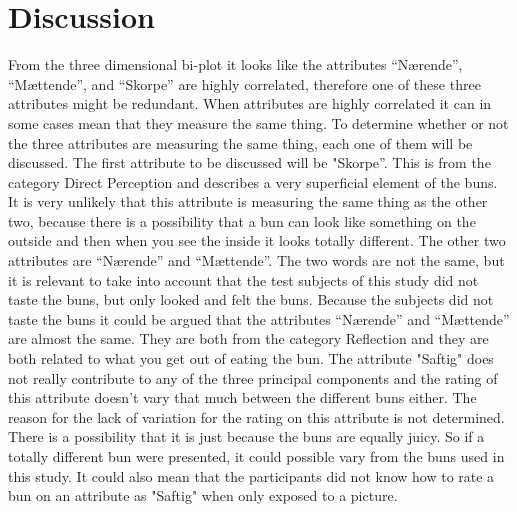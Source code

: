 \section*{Discussion}
\label{discussion}
%
From the three dimensional bi-plot it looks like the attributes “Nærende”, “Mættende”, and “Skorpe” are highly correlated, therefore one of these three attributes might be redundant. 
When attributes are highly correlated it can in some cases mean that they measure the same thing. To determine whether or not the three attributes are measuring the same thing, each one of them will be discussed. \blankline
%
The first attribute to be discussed will be "Skorpe''. This is from the category Direct Perception and describes a very superficial element of the buns. It is very unlikely that this attribute is measuring the same thing as the other two, because there is a possibility that a bun can look like something on the outside and then when you see the inside it looks totally different. \blankline
%
The other two attributes are “Nærende” and “Mættende”. The two words are not the same, but it is relevant to take into account that the test subjects of this study did not taste the buns, but only looked and felt the buns. Because the subjects did not taste the buns it could be argued that the attributes “Nærende” and “Mættende” are almost the same. They are both from the category Reflection and they are both related to what you get out of eating the bun. \blankline
%
The attribute "Saftig" does not really contribute to any of the three principal components and the rating of this attribute doesn't vary that much between the different buns either. The reason for the lack of variation for the rating on this attribute is not determined. There is a possibility that it is just because the buns are equally juicy. So if a totally different bun were presented, it could possible vary from the buns used in this study. It could also mean that the participants did not know how to rate a bun on an attribute as "Saftig" when only exposed to a picture.
